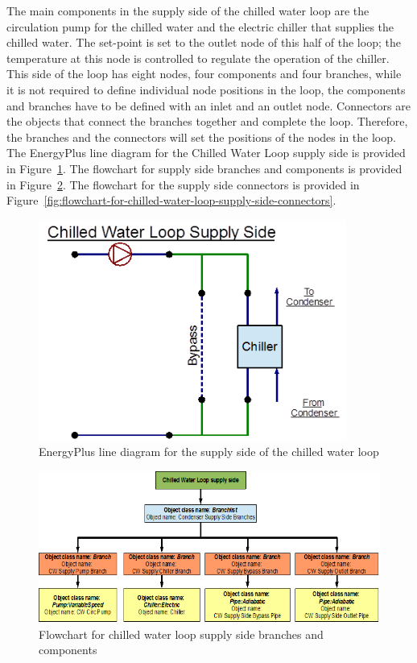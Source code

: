 The main components in the supply side of the chilled water loop are the circulation pump for the chilled water and the electric chiller that supplies the chilled water. The set-point is set to the outlet node of this half of the loop; the temperature at this node is controlled to regulate the operation of the chiller. This side of the loop has eight nodes, four components and four branches, while it is not required to define individual node positions in the loop, the components and branches have to be defined with an inlet and an outlet node. Connectors are the objects that connect the branches together and complete the loop. Therefore, the branches and the connectors will set the positions of the nodes in the loop. The EnergyPlus line diagram for the Chilled Water Loop supply side is provided in Figure~\ref{fig:energyplus-line-diagram-for-the-supply-side}. The flowchart for supply side branches and components is provided in Figure~\ref{fig:flowchart-for-chilled-water-loop-supply-side-and}. The flowchart for the supply side connectors is provided in Figure~\ref{fig:flowchart-for-chilled-water-loop-supply-side-connectors}.

\begin{figure}[hbtp] %
\centering
\includegraphics[width=0.9\textwidth, height=0.9\textheight, keepaspectratio=true]{media/image018.png}
\caption{EnergyPlus line diagram for the supply side of the chilled water loop \protect \label{fig:energyplus-line-diagram-for-the-supply-side}}
\end{figure}

\begin{figure}[htbp] %
\centering
\includegraphics{media/image019.png}
\caption{Flowchart for chilled water loop supply side branches and components \protect \label{fig:flowchart-for-chilled-water-loop-supply-side-and}}
\end{figure}

